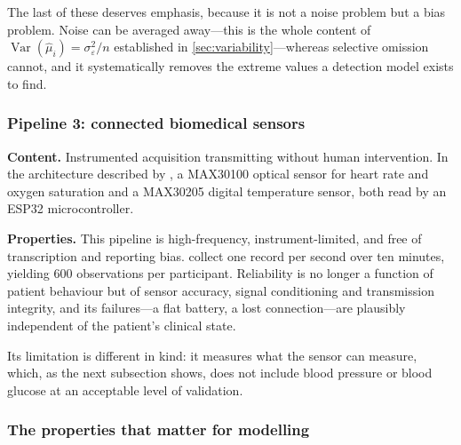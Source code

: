\documentclass[12pt,a4paper,oneside]{report}
\begin{document}
The last of these deserves emphasis, because it is not a noise problem but a bias problem. Noise can be averaged away---this is the whole content of $\operatorname{Var}(\hat\mu_i) = \sigma_\varepsilon^2/n$ established in \cref{sec:variability}---whereas selective omission cannot, and it systematically removes the extreme values a detection model exists to find.

\subsubsection{Pipeline 3: connected biomedical sensors}

\textbf{Content.} Instrumented acquisition transmitting without human intervention. In the architecture described by \textcite{efendi2025}, a MAX30100 optical sensor for heart rate and oxygen saturation and a MAX30205 digital temperature sensor, both read by an ESP32 microcontroller.

\textbf{Properties.} This pipeline is high-frequency, instrument-limited, and free of transcription and reporting bias. \Textcite{efendi2025} collect one record per second over ten minutes, yielding 600 observations per participant. Reliability is no longer a function of patient behaviour but of sensor accuracy, signal conditioning and transmission integrity, and its failures---a flat battery, a lost connection---are plausibly independent of the patient's clinical state.

Its limitation is different in kind: it measures what the sensor can measure, which, as the next subsection shows, does not include blood pressure or blood glucose at an acceptable level of validation.

\subsubsection{The properties that matter for modelling}
\end{document}

